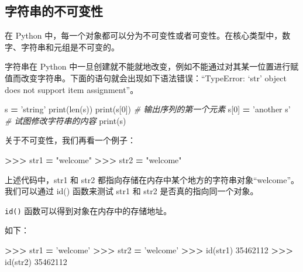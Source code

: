 \documentclass[]{ctexbook}
\newenvironment{Shaded}{\begin{snugshade}}{\end{snugshade}}
\newcommand{\BuiltInTok}[1]{#1}
\newcommand{\CommentTok}[1]{\textcolor[rgb]{0.56,0.35,0.01}{\textit{#1}}}
\newcommand{\DecValTok}[1]{\textcolor[rgb]{0.00,0.00,0.81}{#1}}
\newcommand{\NormalTok}[1]{#1}
\newcommand{\OperatorTok}[1]{\textcolor[rgb]{0.81,0.36,0.00}{\textbf{#1}}}
\newcommand{\StringTok}[1]{\textcolor[rgb]{0.31,0.60,0.02}{#1}}
\begin{document}
\hypertarget{ux5b57ux7b26ux4e32ux7684ux4e0dux53efux53d8ux6027}{%
\subsection{字符串的不可变性}\label{ux5b57ux7b26ux4e32ux7684ux4e0dux53efux53d8ux6027}}

在 Python 中，每一个对象都可以分为不可变性或者可变性。在核心类型中，数字、字符串和元组是不可变的。

字符串在 Python 中一旦创建就不能就地改变，例如不能通过对其某一位置进行赋值而改变字符串。下面的语句就会出现如下语法错误：``TypeError: `str' object does not support item assignment''。

\begin{Shaded}
\begin{Highlighting}[]
\NormalTok{s }\OperatorTok{=} \StringTok{'string'}
\BuiltInTok{print}\NormalTok{(}\BuiltInTok{len}\NormalTok{(s))}
\BuiltInTok{print}\NormalTok{(s[}\DecValTok{0}\NormalTok{])                 }\CommentTok{# 输出序列的第一个元素}
\NormalTok{s[}\DecValTok{0}\NormalTok{] }\OperatorTok{=} \StringTok{'another s'}          \CommentTok{# 试图修改字符串的内容}
\BuiltInTok{print}\NormalTok{(s)}
\end{Highlighting}
\end{Shaded}

关于不可变性，我们再看一个例子：

\begin{Shaded}
\begin{Highlighting}[]
\OperatorTok{>>>}\NormalTok{ str1 }\OperatorTok{=} \StringTok{"welcome"}
\OperatorTok{>>>}\NormalTok{ str2 }\OperatorTok{=} \StringTok{"welcome"}
\end{Highlighting}
\end{Shaded}

上述代码中，str1 和 str2 都指向存储在内存中某个地方的字符串对象``welcome''。我们可以通过 id() 函数来测试 str1 和 str2 是否真的指向同一个对象。

\texttt{id()} 函数可以得到对象在内存中的存储地址。

如下：

\begin{Shaded}
\begin{Highlighting}[]
\OperatorTok{>>>}\NormalTok{ str1 }\OperatorTok{=} \StringTok{'welcome'}
\OperatorTok{>>>}\NormalTok{ str2 }\OperatorTok{=} \StringTok{'welcome'}
\OperatorTok{>>>} \BuiltInTok{id}\NormalTok{(str1)}
\DecValTok{35462112}
\OperatorTok{>>>} \BuiltInTok{id}\NormalTok{(str2)}
\DecValTok{35462112}
\end{Highlighting}
\end{Shaded}
\end{document}

